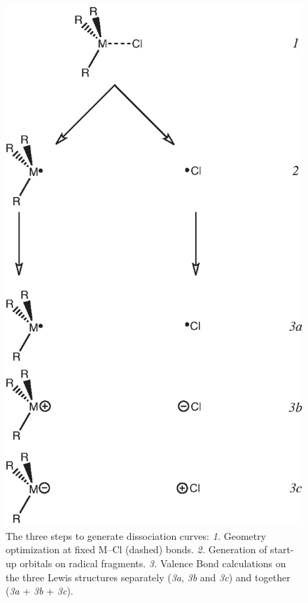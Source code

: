 \begin{figure}[ht]
\begin{center}
\includegraphics{dissociation/figures/scheme1.eps}
\end{center}
\caption{The three steps to generate dissociation curves: \textit{1.} Geometry optimization at fixed M--Cl (dashed) bonds. \textit{2.} Generation of start-up orbitals on radical fragments. \textit{3.} Valence Bond calculations on the three Lewis structures separately (\textit{3a}, \textit{3b} and \textit{3c}) and together (\textit{3a} + \textit{3b} + \textit{3c}).} 
\label{ch3.fig.scheme1}
\end{figure}
